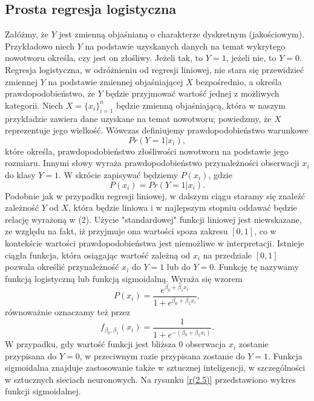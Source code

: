 \documentclass[a4paper]{article}
\begin{document}
\subsection{Prosta regresja logistyczna}
Załóżmy, że $Y$ jest zmienną objaśnianą o charakterze dyskretnym (jakościowym). Przykładowo niech $Y$ na podstawie uzyskanych danych na temat wykrytego nowotworu określa, czy jest on złośliwy. Jeżeli tak, to $Y=1$, jeżeli nie, to $Y=0$. Regresja logistyczna, w odróżnieniu od regresji liniowej, nie stara się przewidzieć zmiennej $Y$ na podstawie zmiennej objaśniającej $X$ bezpośrednio, a określa prawdopodobieństwo, że $Y$ będzie przyjmować wartość jednej z możliwych kategorii. Niech $X= \{x_i\}_{i=1}^n$ będzie zmienną objaśniającą, która w naszym przykładzie zawiera dane uzyskane na temat nowotworu; powiedzmy, że $X$ reprezentuje jego wielkość. Wówczas definiujemy prawdopodobieństwo warunkowe
\begin{equation}
    Pr(Y = 1|x_i),
\end{equation}
które określa, prawdopodobieństwo złośliwości nowotworu na podstawie jego rozmiaru. Innymi słowy wyraża prawdopodobieństwo przynależności obserwacji $x_i$ do klasy $Y=1$. W skrócie zapisywać będziemy $P(x_i)$, gdzie
\begin{equation}\label{(2.23)}
    P(x_i) = Pr(Y=1|x_i).
\end{equation}
Podobnie jak w przypadku regresji liniowej, w dalszym ciągu staramy się znaleźć zależność $Y$ od $X$, która będzie liniowa i w najlepszym stopniu oddawać będzie relację wyrażoną w {(2)}. Użycie "standardowej" funkcji liniowej jest niewskazane, ze względu na fakt, iż przyjmuje ona wartości spoza zakresu $[0,1]$, co w kontekście wartości prawdopodobieństwa jest niemożliwe w interpretacji.  Istnieje ciągła funkcja, która osiągając wartość zależną od $x_i$ na przedziale $[0,1]$ pozwala określić przynależność $x_i$ do $Y=1$ lub do $Y=0$. Funkcję tę  nazywamy funkcją logistyczną lub funkcją sigmoidalną. Wyraża się wzorem
\begin{equation}
    P(x_i) = \frac{e^{\beta_0 + \beta_1x_i}}{1 + e^{\beta_0 + \beta_1x_i}},
\end{equation}
równoważnie oznaczamy też przez 
\begin{equation}\label{(2.25)}
    f_{\beta_0,\beta_1}(x_i) = \frac{1}{1 + e^{-(\beta_0 + \beta_1x_i)}}.
\end{equation}
 W przypadku, gdy wartość funkcji jest bliższa $0$ obserwacja $x_i$ zostanie przypisana do $Y=0$, w przeciwnym razie przypisana zostanie do $Y=1$. Funkcja sigmoidalna znajduje zastosowanie także w sztucznej inteligencji, w szczególności w sztucznych sieciach neuronowych.  Na rysunku \ref{r(2.5)} przedstawiono wykres funkcji sigmoidalnej.
\end{document}
